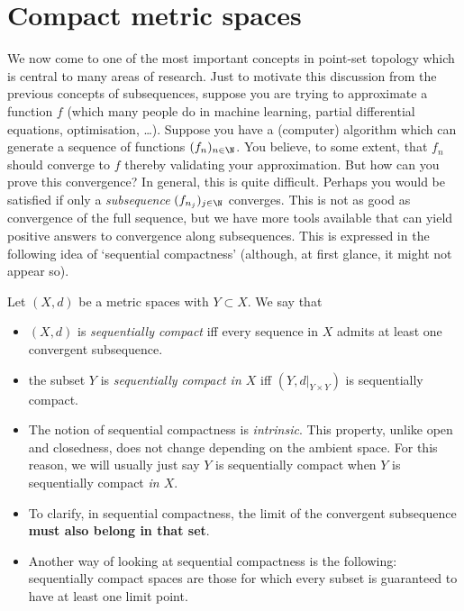 \section{Compact metric spaces}
\label{sec:cpct_met_spaces}
We now come to one of the most important concepts in point-set topology which is central to many areas of research. Just to motivate this discussion from the previous concepts of subsequences, suppose you are trying to approximate a function $f$ (which many people do in machine learning, partial differential equations, optimisation, \dots). Suppose you have a (computer) algorithm which can generate a sequence of functions $(f_n)_{n\in\N}$. You believe, to some extent, that $f_n$ should converge to $f$ thereby validating your approximation. But how can you prove this convergence? In general, this is quite difficult. Perhaps you would be satisfied if only a \textit{subsequence} $(f_{n_j})_{j\in\N}$ converges. This is not as good as convergence of the full sequence, but we have more tools available that can yield positive answers to convergence along subsequences. This is expressed in the following idea of `sequential compactness' (although, at first glance, it might not appear so).
\begin{defn}
\label{defn:seq_cpct}
Let $(X,d)$ be a metric spaces with $Y\subset X$. We say that
\begin{itemize}
	\item $(X,d)$ is \textit{sequentially compact} iff every sequence in $X$ admits at least one convergent subsequence.
	\item the subset $Y$ is \textit{sequentially compact in $X$} iff $(Y,d|_{Y\times Y})$ is sequentially compact.
\end{itemize}
\end{defn}
\begin{rem}
\begin{itemize}
	\item The notion of sequential compactness is \textit{intrinsic}. This property, unlike open and closedness, does not change depending on the ambient space. For this reason, we will usually just say $Y$ is sequentially compact when $Y$ is sequentially compact \textit{in $X$}.
	\item To clarify, in sequential compactness, the limit of the convergent subsequence \textbf{must also belong in that set}.
	\item Another way of looking at sequential compactness is the following: sequentially compact spaces are those for which every subset is guaranteed to have at least one limit point.
\end{itemize}
\end{rem}
